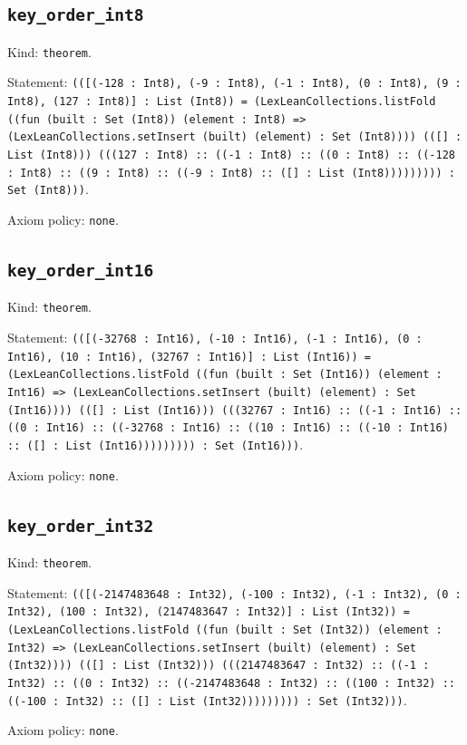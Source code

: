 \documentclass[11pt]{article}
\begin{document}
\subsection*{\texttt{key\_order\_int8}}
\noindent Kind: \texttt{theorem}.\par
\noindent Statement: \texttt{(([(-128 : Int8), (-9 : Int8), (-1 : Int8), (0 : Int8), (9 : Int8), (127 : Int8)] : List (Int8)) = (LexLeanCollections.listFold ((fun (built : Set (Int8)) (element : Int8) => (LexLeanCollections.setInsert (built) (element) : Set (Int8)))) (([] : List (Int8))) (((127 : Int8) :: ((-1 : Int8) :: ((0 : Int8) :: ((-128 : Int8) :: ((9 : Int8) :: ((-9 : Int8) :: ([] : List (Int8))))))))) : Set (Int8)))}.\par
\noindent Axiom policy: \texttt{none}.\par
\subsection*{\texttt{key\_order\_int16}}
\noindent Kind: \texttt{theorem}.\par
\noindent Statement: \texttt{(([(-32768 : Int16), (-10 : Int16), (-1 : Int16), (0 : Int16), (10 : Int16), (32767 : Int16)] : List (Int16)) = (LexLeanCollections.listFold ((fun (built : Set (Int16)) (element : Int16) => (LexLeanCollections.setInsert (built) (element) : Set (Int16)))) (([] : List (Int16))) (((32767 : Int16) :: ((-1 : Int16) :: ((0 : Int16) :: ((-32768 : Int16) :: ((10 : Int16) :: ((-10 : Int16) :: ([] : List (Int16))))))))) : Set (Int16)))}.\par
\noindent Axiom policy: \texttt{none}.\par
\subsection*{\texttt{key\_order\_int32}}
\noindent Kind: \texttt{theorem}.\par
\noindent Statement: \texttt{(([(-2147483648 : Int32), (-100 : Int32), (-1 : Int32), (0 : Int32), (100 : Int32), (2147483647 : Int32)] : List (Int32)) = (LexLeanCollections.listFold ((fun (built : Set (Int32)) (element : Int32) => (LexLeanCollections.setInsert (built) (element) : Set (Int32)))) (([] : List (Int32))) (((2147483647 : Int32) :: ((-1 : Int32) :: ((0 : Int32) :: ((-2147483648 : Int32) :: ((100 : Int32) :: ((-100 : Int32) :: ([] : List (Int32))))))))) : Set (Int32)))}.\par
\noindent Axiom policy: \texttt{none}.\par
\end{document}
